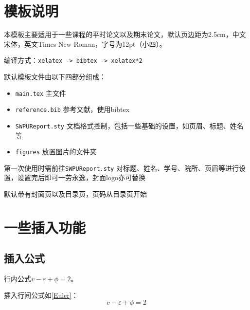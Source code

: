 \documentclass[12pt,hyperref,a4paper,UTF8]{ctexart}
\begin{document}
\cover

%
%

\thispagestyle{empty} %

\newpage
\tableofcontents

\newpage


\section{模板说明}
本模板主要适用于一些课程的平时论文以及期末论文，默认页边距为2.5cm，中文宋体，英文Times New Roman，字号为12pt（小四）。

编译方式：\verb|xelatex -> bibtex -> xelatex*2|


默认模板文件由以下四部分组成：
\begin{itemize}
    \item \texttt{main.tex} 主文件
    \item \texttt{reference.bib} 参考文献，使用bibtex
    \item \texttt{SWPUReport.sty} 文档格式控制，包括一些基础的设置，如页眉、标题、姓名等
    \item \texttt{figures} 放置图片的文件夹
\end{itemize}

第一次使用时需前往\texttt{SWPUReport.sty} 对标题、姓名、学号、院所、页眉等进行设置，设置完后即可一劳永逸，封面logo亦可替换

默认带有封面页以及目录页，页码从目录页开始

\section{一些插入功能}
\subsection{插入公式}
行内公式$v-\varepsilon+\phi=2$。

插入行间公式如\autoref{Euler}：
\begin{equation}
    v-\varepsilon+\phi=2
    \label{Euler}
\end{equation}
\end{document}
